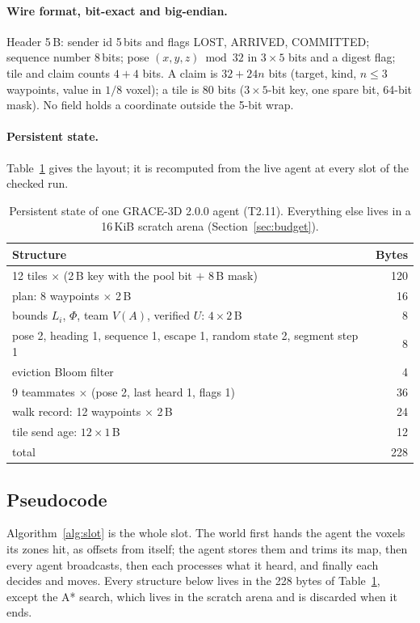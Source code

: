 \documentclass[11pt,a4paper]{article}
\begin{document}
\paragraph{Wire format, bit-exact and big-endian.} Header 5\,B: sender id 5\,bits and flags LOST, ARRIVED, COMMITTED;
sequence number 8\,bits; pose $(x,y,z)\bmod32$ in $3\times5$ bits and a digest flag; tile and claim counts $4+4$ bits. A
claim is $32+24n$ bits (target, kind, $n\le3$ waypoints, value in $1/8$ voxel); a tile is 80 bits ($3\times5$-bit key,
one spare bit, 64-bit mask). No field holds a coordinate outside the 5-bit wrap.

\paragraph{Persistent state.} Table~\ref{tab:memory} gives the layout; it is recomputed from the live agent at every
slot of the checked run.

\begin{table}[htbp]\centering\small
\begin{tabular}{lr}
\toprule
Structure & Bytes \\
\midrule
12 tiles $\times$ (2\,B key with the pool bit $+$ 8\,B mask) & 120 \\
plan: 8 waypoints $\times$ 2\,B & 16 \\
bounds $L_i$, $\Phi$, team $V(A)$, verified $U$: $4\times2$\,B & 8 \\
pose 2, heading 1, sequence 1, escape 1, random state 2, segment step 1 & 8 \\
eviction Bloom filter & 4 \\
9 teammates $\times$ (pose 2, last heard 1, flags 1) & 36 \\
walk record: 12 waypoints $\times$ 2\,B & 24 \\
tile send age: $12\times1$\,B & 12 \\
\midrule
total & 228 \\
\bottomrule
\end{tabular}
\caption{Persistent state of one GRACE-3D 2.0.0 agent (T2.11). Everything else lives in a 16\,KiB scratch arena
(Section~\ref{sec:budget}).}
\label{tab:memory}
\end{table}

\subsection{Pseudocode}

Algorithm~\ref{alg:slot} is the whole slot. The world first hands the agent the voxels its zones hit, as offsets from
itself; the agent stores them and trims its map, then every agent broadcasts, then each processes what it heard, and
finally each decides and moves. Every structure below lives in the 228 bytes of Table~\ref{tab:memory}, except the A* search,
which lives in the scratch arena and is discarded when it ends.
\end{document}
